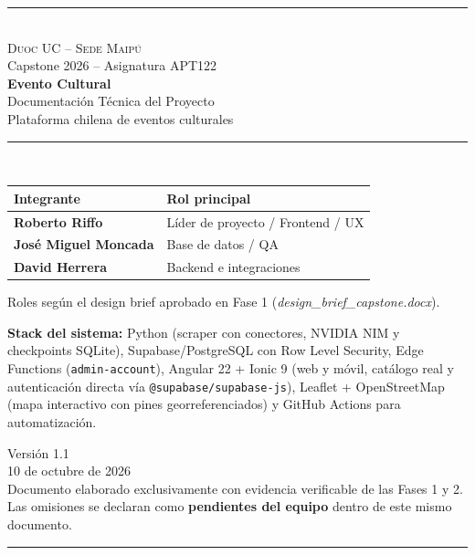 \documentclass[11pt,a4paper]{article}
\title{}
\author{}
\date{}
\begin{document}
\begin{titlepage}
\centering
{\color{terracota}\rule{\textwidth}{2pt}}\\[0.6cm]
{\Large \textsc{Duoc UC -- Sede Maipú}}\\[0.2cm]
{\large Capstone 2026 -- Asignatura APT122}\\[1.4cm]
{\color{terracota}\Huge \textbf{Evento Cultural}}\\[0.5cm]
{\LARGE Documentación Técnica del Proyecto}\\[0.4cm]
{\large Plataforma chilena de eventos culturales}\\[1.2cm]
{\color{terracota}\rule{\textwidth}{1pt}}\\[1.2cm]

\begin{minipage}{0.82\textwidth}
\renewcommand{\arraystretch}{1.35}
\begin{center}
\begin{tabular}{>{\bfseries}l l}
Integrante & Rol principal \\ \midrule
Roberto Riffo & Líder de proyecto / Frontend / UX \\
José Miguel Moncada & Base de datos / QA \\
David Herrera & Backend e integraciones \\
\end{tabular}
\end{center}
\vspace{0.2cm}
{\small Roles según el design brief aprobado en Fase 1 (\textit{design\_brief\_capstone.docx}).}
\end{minipage}

\vspace{1.2cm}
\begin{minipage}{0.82\textwidth}
\small
\textbf{Stack del sistema:} Python (scraper con conectores, NVIDIA NIM y checkpoints SQLite),
Supabase/PostgreSQL con Row Level Security, Edge Functions (\texttt{admin-account}),
Angular 22 + Ionic 9 (web y móvil, catálogo real y autenticación directa vía \texttt{@supabase/supabase-js}),
Leaflet + OpenStreetMap (mapa interactivo con pines georreferenciados) y GitHub Actions para automatización.
\end{minipage}

\vfill
{\large Versión 1.1}\\[0.2cm]
{\large 10 de octubre de 2026}\\[0.4cm]
{\small Documento elaborado exclusivamente con evidencia verificable de las Fases 1 y 2.\\
Las omisiones se declaran como \textcolor{rojo}{\textbf{pendientes del equipo}} dentro
de este mismo documento.}\\[0.3cm]
{\color{terracota}\rule{\textwidth}{2pt}}
\end{titlepage}
\end{document}
